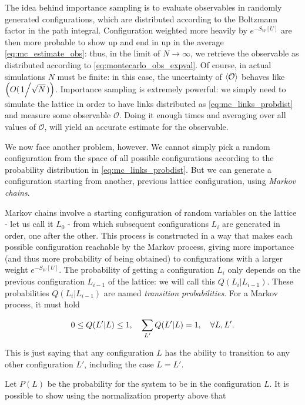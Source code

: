 \documentclass[reqno,12pt]{article}
\numberwithin{equation}{section}
\begin{document}
The idea behind importance sampling is to evaluate observables in randomly generated configurations, which are
distributed according to the Boltzmann factor in the path integral. Configuration weighted more heavily by $e^{-S_W[U]}$
are then more probable to show up and end in up in the average \eqref{eq:mc_estimate_obs}: thus, in the limit of
$N \rightarrow \infty$, we retrieve the observable as distributed according to \eqref{eq:montecarlo_obs_expval}. Of course,
in actual simulations $N$ must be finite: in this case, the uncertainty of $\expval{\mathcal{O}}$ behaves like 
$\qty(O(\flatfrac{1}{\sqrt{N}}))$. Importance sampling is extremely powerful: we simply need to simulate the lattice
in order to have links distributed as \eqref{eq:mc_links_probdist} and measure some observable $\mathcal{O}$.
Doing it enough times and averaging over all values of $\mathcal{O}$, will yield an accurate estimate for the observable.

We now face another problem, however. We cannot simply pick a random configuration from the space of all possible
configurations according to the probability distribution in \eqref{eq:mc_links_probdist}. But we can
generate a configuration starting from another, previous lattice configuration, using \textit{Markov chains}.

Markov chains involve a starting configuration of random variables on the
lattice - let us call it $L_0$ - from which subsequent configurations $L_i$ are generated in order, one after the other.
This process is constructed in a way that makes each possible configuration reachable by the Markov process, giving more
importance (and thus more probability of being obtained) to configurations with a larger weight $e^{-S_W[U]}$. The 
probability of getting a configuration $L_i$ only depends on the previous configuration $L_{i-1}$ of the lattice:
we will call this $Q(L_i|L_{i-1})$. These probabilities $Q(L_i|L_{i-1})$ are named \textit{transition probabilities}.
For a Markov process, it must hold

\begin{equation}
	0 \le Q(L'| L) \le 1 \qc \sum_{L'} Q(L'|L) = 1 \qc \forall L,L'. 
\end{equation}

This is just saying that any configuration $L$ has the ability to transition to any other configuration $L'$, including
the case $L = L'$.

Let $P(L)$ be the probability for the system to be in the configuration $L$. It is possible to show using the normalization
property above that
\end{document}

